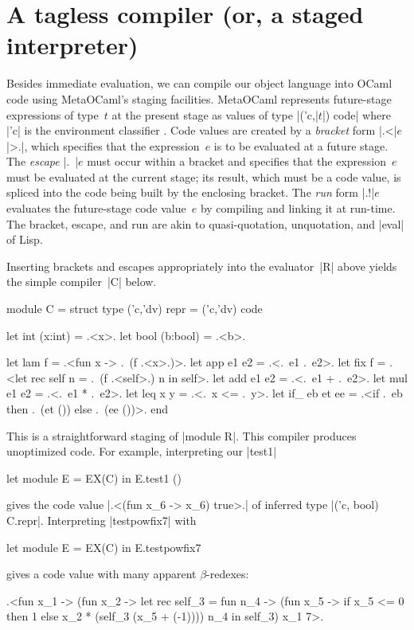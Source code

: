 \documentclass[preprint]{sigplanconf}
\begin{document}
\begin{comment}
module EX1(S: Symantics) = struct
 open S
 let tfix () = app (fix (fun self -> self)) (int 1)
end;;
let module E =EX1(R) in E.tfix ();;
let module E =EX1(L) in E.tfix ();;
\end{comment}

\section{A tagless compiler (or, a staged interpreter)}\label{compiler}

Besides immediate evaluation, we can compile our object language
into OCaml code using MetaOCaml's staging facilities. MetaOCaml
represents future-stage expressions of type~$t$ at the
present stage as values of type |('c,|$t$|) code| where |'c| is the
environment classifier \citep{WalidPOPL03,calcagno-ml-like}. Code values are created
by a \emph{bracket} form |.<|$e$|>.|, which specifies that the expression~$e$ is to be
evaluated at a future stage. The \emph{escape} |.~|$e$ must occur
within a bracket and specifies that the expression~$e$ must be evaluated
at the current stage; its result, which must be a code value, is
spliced into the code being built by the enclosing bracket. The \emph{run} form |.!|$e$ evaluates
the future-stage code value~$e$ by compiling and linking it at run-time.
The bracket, escape, and run are akin to
quasi-quotation, unquotation, and |eval| of Lisp.

Inserting brackets and escapes appropriately into the
evaluator~|R| above yields the simple compiler~|C| below.
\begin{code}
module C = struct
  type ('c,'dv) repr = ('c,'dv) code

  let int (x:int)   = .<x>.
  let bool (b:bool) = .<b>.

  let lam f         = .<fun x -> .~(f .<x>.)>.
  let app e1 e2     = .<.~e1 .~e2>.
  let fix f = 
    .<let rec self n = .~(f .<self>.) n in self>.
  let add e1 e2     = .<.~e1 + .~e2>.
  let mul e1 e2     = .<.~e1 * .~e2>.
  let leq x y       = .<.~x <= .~y>.
  let if_ eb et ee = 
    .<if .~eb then .~(et ()) else .~(ee ())>.
end
\end{code}
This is a straightforward staging of
|module R|.
This compiler produces
unoptimized code. For example, interpreting our |test1|
\begin{code}
let module E = EX(C) in E.test1 ()
\end{code}
gives the code value |.<(fun x_6 -> x_6) true>.|
of inferred type |('c, bool) C.repr|.  Interpreting |testpowfix7|
with
\begin{code}
let module E = EX(C) in E.testpowfix7
\end{code}
gives a code value with many apparent $\beta$-redexes:
\begin{code}
.<fun x_1 -> (fun x_2 ->
  let rec self_3 = fun n_4 ->
   (fun x_5 -> if x_5 <= 0 then 1 
               else x_2 * (self_3 (x_5 + (-1))))
   n_4 in self_3) x_1 7>.
\end{code}
\end{document}
